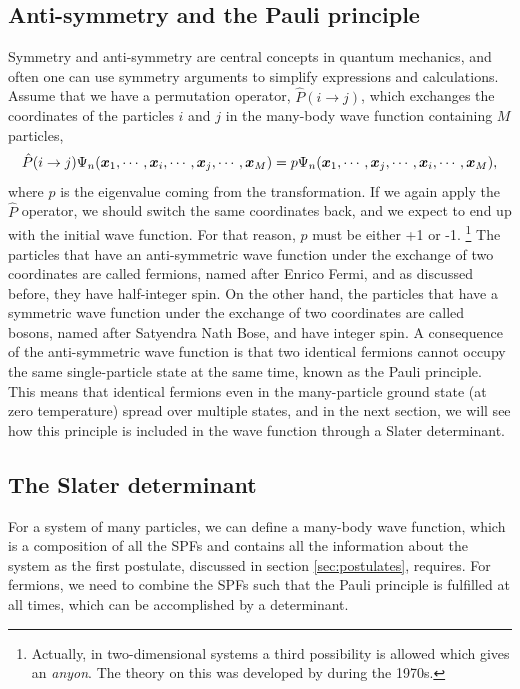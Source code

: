 \subsection{Anti-symmetry and the Pauli principle} \label{sec:symmetry}
Symmetry and anti-symmetry are central concepts in quantum mechanics, and often one can use symmetry arguments to simplify expressions and calculations. Assume that we have a permutation operator, $\hat{P}(i\rightarrow j)$, which exchanges the coordinates of the particles $i$ and $j$ in the many-body wave function containing $M$ particles,
\begin{equation}
\hat{P}(i\rightarrow j)\Psi_n(\boldsymbol{{x}}_1,\cdots,\boldsymbol{{x}}_i,\cdots,\boldsymbol{{x}}_j,\cdots,\boldsymbol{{x}}_M)=p\Psi_n(\boldsymbol{{x}}_1,\cdots,\boldsymbol{{x}}_j,\cdots,\boldsymbol{{x}}_i,\cdots,\boldsymbol{{x}}_M),
\end{equation}
where $p$ is the eigenvalue coming from the transformation. If we again apply the $\hat{P}$ operator, we should switch the same coordinates back, and we expect to end up with the initial wave function. For that reason, $p$ must be either +1 or -1. \footnote{Actually, in two-dimensional systems a third possibility is allowed which gives an \textit{anyon}. The theory on this was developed by \citet{leinaas_one_1977} during the 1970s.} The particles that have an anti-symmetric wave function under the exchange of two coordinates are called fermions, named after Enrico Fermi, and as discussed before, they have half-integer spin. On the other hand, the particles that have a symmetric wave function under the exchange of two coordinates are called bosons, named after Satyendra Nath Bose, and have integer spin. A consequence of the anti-symmetric wave function is that two identical fermions cannot occupy the same single-particle state at the same time, known as the Pauli principle. This means that identical fermions even in the many-particle ground state (at zero temperature) spread over multiple states, and in the next section, we will see how this principle is included in the wave function through a Slater determinant. 

\subsection{The Slater determinant} \label{sec:slater}
For a system of many particles, we can define a many-body wave function, which is a composition of all the SPFs and contains all the information about the system as the first postulate, discussed in section \ref{sec:postulates}, requires. For fermions, we need to combine the SPFs such that the Pauli principle is fulfilled at all times, which can be accomplished by a determinant. 

